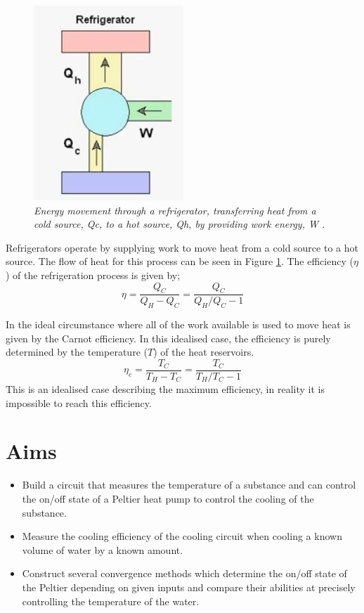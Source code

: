 \documentclass[10pt]{article}
\begin{document}
\begin{figure}[h!]
    \centering
    \includegraphics[scale=.75]{ref.jpg}
    \caption{\it{Energy movement through a refrigerator, transferring heat from a cold source, Qc, to a hot source, Qh, by providing work energy, W \cite{fridge}.}}
    \label{fig:fridge}
\end{figure}

Refrigerators operate by supplying work to move heat from a cold source to a hot source. The flow of heat for this process can be seen in Figure \ref{fig:fridge}. The efficiency ($\eta$) of the refrigeration process is given by;
\begin{equation}\label{eq:eff}
    \eta = \frac{Q_C}{Q_H-Q_C}=\frac{Q_C}{Q_H/Q_C - 1}
\end{equation}

In the ideal circumstance where all of the work available is used to move heat is given by the Carnot efficiency\cite{carnot}. In this idealised case, the efficiency is purely determined by the temperature ($T$) of the heat reservoirs.
\begin{equation}\label{eq:carn_eff}
        \eta_c = \frac{T_C}{T_H-T_C}=\frac{T_C}{T_H/T_C - 1}
\end{equation}
This is an idealised case describing the maximum efficiency, in reality it is impossible to reach this efficiency. 




\section*{Aims}
\begin{itemize}
    \item Build a circuit that measures the temperature of a substance and can control the on/off state of a Peltier heat pump\cite{peltier} to control the cooling of the substance. 
    \item Measure the cooling efficiency of the cooling circuit when cooling a known volume of water by a known amount.
    \item Construct several convergence methods which determine the on/off state of the Peltier depending on given inputs and compare their abilities at precisely controlling the temperature of the water.
\end{itemize}
\end{document}
